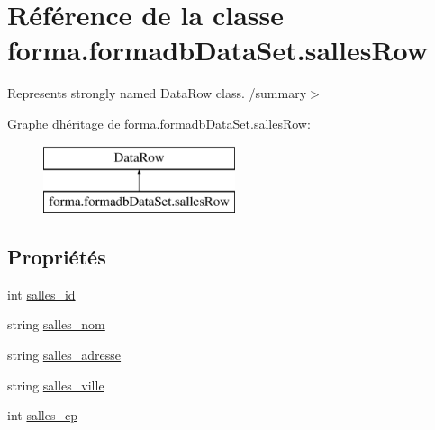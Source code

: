 \hypertarget{classforma_1_1formadb_data_set_1_1salles_row}{}\section{Référence de la classe forma.\+formadb\+Data\+Set.\+salles\+Row}
\label{classforma_1_1formadb_data_set_1_1salles_row}


Represents strongly named Data\+Row class. /summary$>$  


Graphe d\textquotesingle{}héritage de forma.\+formadb\+Data\+Set.\+salles\+Row\+:\begin{figure}[H]
\begin{center}
\leavevmode
\includegraphics[height=2.000000cm]{classforma_1_1formadb_data_set_1_1salles_row}
\end{center}
\end{figure}
\subsection*{Propriétés}
\begin{DoxyCompactItemize}
\item 
int \hyperlink{classforma_1_1formadb_data_set_1_1salles_row_a0ba021b6af4a7799f8dfb36f374e5b7c}{salles\+\_\+id}
\item 
string \hyperlink{classforma_1_1formadb_data_set_1_1salles_row_a9ad5b41e31ceeabf166d55017cf22df1}{salles\+\_\+nom}
\item 
string \hyperlink{classforma_1_1formadb_data_set_1_1salles_row_a6e438d5ee016cf644d96d3e1e6ab19db}{salles\+\_\+adresse}
\item 
string \hyperlink{classforma_1_1formadb_data_set_1_1salles_row_a66013ab4d6b02d684518187cf893cb22}{salles\+\_\+ville}
\item 
int \hyperlink{classforma_1_1formadb_data_set_1_1salles_row_aca5445a734b8814d1c7d7d5f42f3747a}{salles\+\_\+cp}
\end{DoxyCompactItemize}



